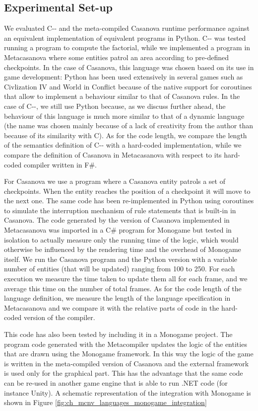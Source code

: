 \subsection{Experimental Set-up}
We evaluated C-{}- and the meta-compiled Casanova runtime performance against an equivalent implementation of equivalent programs in Python. C-{}- was tested running a program to compute the factorial, while we implemented a program in Metacasanova where some entities patrol an area according to pre-defined checkpoints. In the case of Casanova, this language was chosen based on its use in game development: Python has been used extensively in several games such as Civlization IV \cite{CIV4} and World in Conflict \cite{WIC} because of the native support for coroutines that allow to implement a behaviour similar to that of Casanova rules. In the case of C-{}-, we still use Python because, as we discuss further ahead, the behaviour of this language is much more similar to that of a dynamic language (the name was chosen mainly because of a lack of creativity from the author than because of its similarity with C). As for the code length, we compare the length of the semantics definition of C-{}- with a hard-coded implementation, while we compare the definition of Casanova in Metacasanova with respect to its hard-coded compiler written in F\#.

For Casanova we use a program where a Casanova entity patrols a set of checkpoints. When the entity reaches the position of a checkpoint it will move to the next one. The same code has been re-implemented in Python using coroutines to simulate the interruption mechanism of rule statements that is built-in in Casanova. The code generated by the version of Casanova implemented in Metacasanova was imported in a C\# program for Monogame but tested in isolation to actually measure only the running time of the logic, which would otherwise be influenced by the rendering time and the overhead of Monogame itself. We run the Casanova program and the Python version with a variable number of entities (that will be updated) ranging from 100 to 250. For each execution we measure the time taken to update them all for each frame, and we average this time on the number of total frames. As for the code length of the language definition, we measure the length of the language specification in Metacasanova and we compare it with the relative parts of code in the hard-coded version of the compiler.

This code has also been tested by including it in a Monogame project. The program code generated with the Metacompiler updates the logic of the entities that are drawn using the Monogame framework. In this way the logic of the game is written in the meta-compiled version of Casanova and the external framework is used only for the graphical part. This has the advantage that the same code can be re-used in another game engine that is able to run .NET code (for instance Unity). A schematic representation of the integration with Monogame is shown in Figure \ref{fig:ch_mcnv_languages_monogame_integration}

